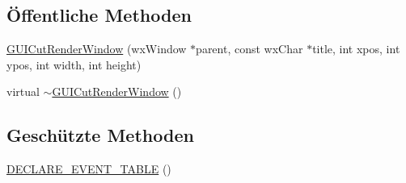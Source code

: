 \subsection*{Öffentliche Methoden}
\begin{DoxyCompactItemize}
\item 
\hyperlink{classGUICutRenderWindow_ae522616f2d98dd3455a1d6dcc4ee877f}{G\-U\-I\-Cut\-Render\-Window} (wx\-Window $\ast$parent, const wx\-Char $\ast$title, int xpos, int ypos, int width, int height)
\item 
virtual \hyperlink{classGUICutRenderWindow_aced4a67c460b8c3ede40763b6da6953d}{$\sim$\-G\-U\-I\-Cut\-Render\-Window} ()
\end{DoxyCompactItemize}
\subsection*{Geschützte Methoden}
\begin{DoxyCompactItemize}
\item 
\hyperlink{classGUICutRenderWindow_a3eda2915b515c63309d996a9c1dc6442}{D\-E\-C\-L\-A\-R\-E\-\_\-\-E\-V\-E\-N\-T\-\_\-\-T\-A\-B\-L\-E} ()
\end{DoxyCompactItemize}
